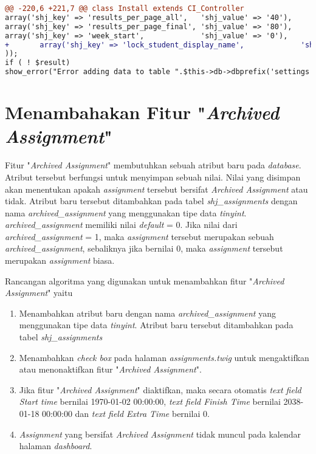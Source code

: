 \begin{lstlisting}[language=diff, caption=Perubahan kode program pada \textit{Install.php}, label=lst:21, basicstyle=\ttfamily, frame=single,
columns=fullflexible, keepspaces=true, breaklines=true]
@@ -220,6 +221,7 @@ class Install extends CI_Controller
array('shj_key' => 'results_per_page_all',   'shj_value' => '40'),
array('shj_key' => 'results_per_page_final', 'shj_value' => '80'),
array('shj_key' => 'week_start',             'shj_value' => '0'),
+   	array('shj_key' => 'lock_student_display_name',             'shj_value' => '1'),
));
if ( ! $result)
show_error("Error adding data to table ".$this->db->dbprefix('settings'));
\end{lstlisting}

\section{Menambahakan Fitur "\textit{Archived Assignment}"}
\label{chap:arc}
Fitur "\textit{Archived Assignment}" membutuhkan sebuah atribut baru pada \textit{database}. Atribut tersebut berfungsi untuk menyimpan sebuah nilai. Nilai yang disimpan akan menentukan apakah \textit{assignment} tersebut bersifat \textit{Archived Assignment} atau tidak. Atribut baru tersebut  ditambahkan pada tabel \textit{shj\_assignments} dengan nama \textit{archived\_assignment} yang menggunakan tipe data \textit{tinyint}. \textit{archived\_assignment} memiliki nilai \textit{default} = 0. Jika nilai dari \textit{archived\_assignment} = 1, maka \textit{assignment} tersebut merupakan sebuah \textit{archived\_assignment}, sebaliknya jika bernilai 0, maka \textit{assignment} tersebut merupakan \textit{assignment} biasa.

Rancangan algoritma yang digunakan untuk menambahkan fitur "\textit{Archived Assignment}" yaitu
\begin{enumerate}
	\item Menambahkan atribut baru dengan nama \textit{archived\_assignment} yang menggunakan tipe data \textit{tinyint}. Atribut baru tersebut ditambahkan pada tabel \textit{shj\_assignments}
	\item Menambahkan \textit{check box} pada halaman \textit{assignments.twig} untuk mengaktifkan atau menonaktifkan fitur "\textit{Archived Assignment}".
	\item Jika fitur "\textit{Archived Assignment}" diaktifkan, maka secara otomatis \textit{text field Start time} bernilai 1970-01-02 00:00:00, \textit{text field Finish Time} bernilai 2038-01-18 00:00:00 dan \textit{text field Extra Time} bernilai 0.
	\item \textit{Assignment} yang bersifat \textit{Archived Assignment} tidak muncul pada kalendar halaman \textit{dashboard}.
\end{enumerate}

